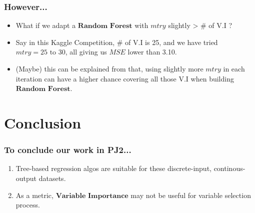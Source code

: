 \documentclass{beamer}
\begin{document}
\begin{frame}
\frametitle{However...}
\begin{itemize}
	\item What if we adapt a $\textbf{Random Forest}$ with $mtry$ slightly > \# of V.I ?
	\item Say in this Kaggle Competition, \# of V.I is 25, and we have tried $mtry = 25 \text{ to } 30$, all giving us $MSE$ lower than 3.10.
	\item (Maybe) this can be explained from that, using slightly more $mtry$ in each iteration can have a higher chance covering all those V.I when building  $\textbf{Random Forest}$.
\end{itemize}
\end{frame}


\section{Conclusion}
\begin{frame}
\frametitle{To conclude our work in PJ2...}
\begin{enumerate}
	\item Tree-based regression algos are suitable for these discrete-input, continous-output datasets.
	\item As a metric, $\textbf{Variable Importance}$ may not be useful for variable selection process.
\end{enumerate}
\end{frame}
\end{document}
